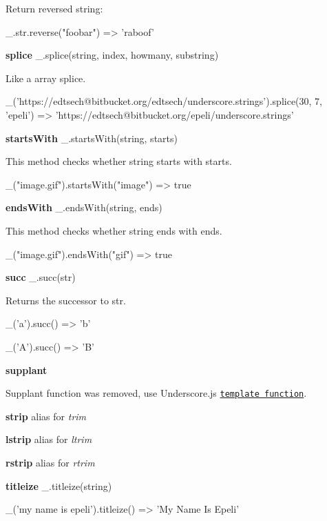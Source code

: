 Return reversed string\+:


\begin{DoxyCode}
\_.str.reverse("foobar")
=> 'raboof'
\end{DoxyCode}


{\bfseries splice} \+\_\+.\+splice(string, index, howmany, substring)

Like a array splice.


\begin{DoxyCode}
\_('https://edtsech@bitbucket.org/edtsech/underscore.strings').splice(30, 7, 'epeli')
=> 'https://edtsech@bitbucket.org/epeli/underscore.strings'
\end{DoxyCode}


{\bfseries starts\+With} \+\_\+.\+starts\+With(string, starts)

This method checks whether string starts with starts.


\begin{DoxyCode}
\_("image.gif").startsWith("image")
=> true
\end{DoxyCode}


{\bfseries ends\+With} \+\_\+.\+ends\+With(string, ends)

This method checks whether string ends with ends.


\begin{DoxyCode}
\_("image.gif").endsWith("gif")
=> true
\end{DoxyCode}


{\bfseries succ} \+\_\+.\+succ(str)

Returns the successor to str.


\begin{DoxyCode}
\_('a').succ()
=> 'b'

\_('A').succ()
=> 'B'
\end{DoxyCode}


{\bfseries supplant}

Supplant function was removed, use Underscore.\+js \href{http://documentcloud.github.com/underscore/#template}{\tt template function}.

{\bfseries strip} alias for {\itshape trim}

{\bfseries lstrip} alias for {\itshape ltrim}

{\bfseries rstrip} alias for {\itshape rtrim}

{\bfseries titleize} \+\_\+.\+titleize(string)


\begin{DoxyCode}
\_('my name is epeli').titleize()
=> 'My Name Is Epeli'
\end{DoxyCode}



